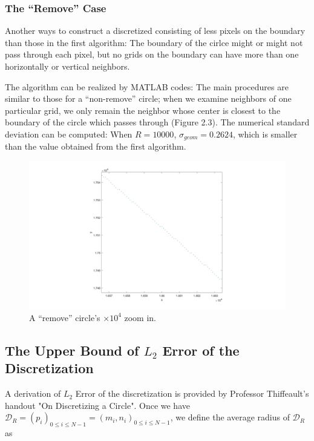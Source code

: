 \documentclass[letterpaper]{article}
\numberwithin{equation}{section} %
\numberwithin{figure}{section} %
\numberwithin{table}{section} %
\begin{document}
	
\subsubsection{The \enquote{Remove} Case}

Another ways to construct a discretized consisting of less pixels on the boundary than those in the first algorithm: The boundary of the cirlce might or might not pass through each pixel, but no grids on the boundary can have more than one horizontally or vertical neighbors.

The algorithm can be realized by MATLAB codes: The main procedures are similar to those for a \enquote{non-remove} circle; when we examine neighbors of one particular grid, we only remain the neighbor whose center is closest to the boundary of the circle which passes through (Figure 2.3). The numerical standard deviation can be computed: When $R=10000$, $\sigma_{geom}=0.2624$, which is smaller than the value obtained from the first algorithm.


\begin{figure}[h]
	\centering
	\includegraphics[width=\textwidth]{rmvCircleZI}
	\caption{A \enquote{remove} circle's $\times 10^4$ zoom in.}
	\label{rmvCircleZI}
\end{figure}

\subsection{The Upper Bound of $L_{2}$ Error of the Discretization}

A derivation of $L_{2}$ Error of the discretization is provided by Professor Thiffeault's handout "On Discretizing a Circle". Once we have $\mathcal{D}_R=(p_{i})_{0 \leq i \leq N-1} = (m_i, n_i)_{0 \leq i \leq N-1}$, we define the average radius of $\mathcal{D}_R$ as
\end{document}
